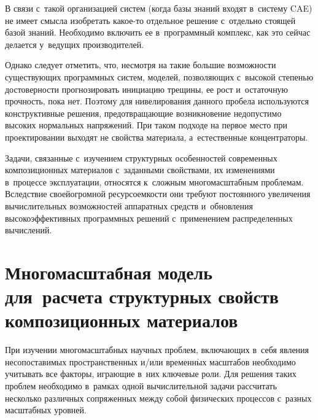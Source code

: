 \begin{multicols}{2}
{} 
     
     В связи с~такой организацией систем (когда базы знаний входят в~сис\-те\-му 
CAE) не имеет смысла изобретать какое-то отдельное решение с~отдельно 
стоящей базой знаний. Необходимо включить ее в~программный комплекс, как 
это сейчас делается у~ведущих производителей.
     
     Однако следует отметить, что, несмотря на такие большие возможности 
существующих про\-грам\-мных сис\-тем, моделей, позволяющих с~высокой степенью 
достоверности прогнозировать инициацию трещины, ее рост и~остаточную 
прочность, пока нет. Поэтому для нивелирования данного пробела используются 
конструктивные решения, предотвращающие возникновение недопустимо 
высоких нормальных напряжений. При таком подходе на первое место при 
проектировании выходят не свойства материала, а~естественные кон\-цент\-ра\-торы.
     
     Задачи, связанные с~изучением структурных особенностей современных 
композиционных материалов с~заданными свойствами, их изменениями 
в~процессе эксплуатации, относятся к~слож\-ным многомасштабным проб\-ле\-мам. 
Вследствие своей\linebreak огромной ресурсоемкости они требуют постоянного 
увеличения вычислительных возможностей аппаратных средств и~обновления 
высокоэффективных программных решений с~применением \mbox{распределенных} 
вычислений.

     
\section{Многомасштабная модель для~расчета структурных свойств 
композиционных материалов}


      При изучении многомасштабных научных проб\-лем, включающих в~себя 
явления несопоставимых пространственных и/или временн$\acute{\mbox{ы}}$х масштабов 
необходимо учитывать все факторы, иг\-ра\-ющие в~них ключевые роли. Для 
решения таких проблем необходимо в~рамках одной вычислительной задачи 
рассчитать несколько различных сопряженных между собой физических 
процессов с~разных масштабных уровней.
     

\end{multicols}
